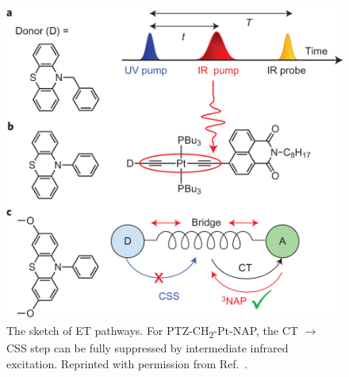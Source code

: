 \begin{figure}[!h]
\includegraphics[width=0.71\columnwidth]{Chapters/chap4/Images/scheme.jpg}
\caption{The sketch of ET pathways. For PTZ-CH\textsubscript{2}-Pt-NAP, the CT $\rightarrow$ CSS step can be fully suppressed by intermediate infrared excitation. Reprinted with permission from Ref.~\cite{delor2015mechanism}.\label{ETscheme}}
\end{figure}


